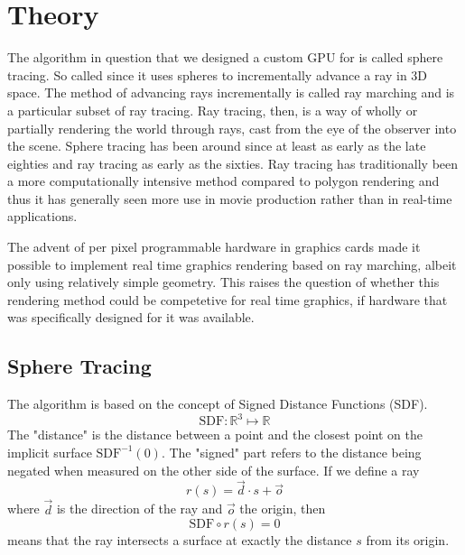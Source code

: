 \chapter{Theory}
	The algorithm in question that we designed a custom GPU for is called
	sphere tracing.\cite{Hart1996} So called since it uses spheres to
	incrementally advance a ray in 3D space. The method of advancing rays
	incrementally is called ray marching and is a particular subset of ray
	tracing.\cite{Whitted1980} Ray tracing, then, is a way of wholly or
	partially rendering the world through rays, cast from the eye of the
	observer into the scene.  Sphere tracing has been around since at least as
	early as the late eighties and ray tracing as early as the
	sixties.\cite{Hart1989,Appel1968} Ray tracing has traditionally been
	a more computationally intensive method compared to polygon rendering\cite{Wylie1967}
	and thus it has generally seen more use in movie production rather than
	in real-time applications.\cite{ref_needed?} 
	
	
	The advent of per pixel programmable hardware in graphics cards made it
	possible to implement real time graphics rendering based on ray marching, 
	albeit only using relatively simple geometry. This raises the question of 
	whether this rendering method could be competetive for real time graphics,
	if hardware that was specifically designed for it was available.
	
		
	\section{Sphere Tracing} 
	
		\begin{minipage}{0.6\textwidth} 
		
			The algorithm is based on the concept of Signed Distance Functions (SDF).
			$$\text{SDF}:\mathbb{R}^{3}\mapsto\mathbb{R}$$ 
			The "distance" is
			the distance between a point and the closest point on the implicit
			surface $\text{SDF}^{-1}(0)$. The "signed" part refers to the
			distance being negated when measured on the other side of the
			surface. If we define a ray $$r(s) = \vec{d} \cdot s + \vec{o}$$
			where $\vec{d}$ is the direction of the ray and $\vec{o}$ the origin,	then $$\text{SDF}\circ r(s) = 0$$ means that the ray
			intersects a surface at exactly the distance $s$ from its origin.
		
		\end{minipage} 
		
